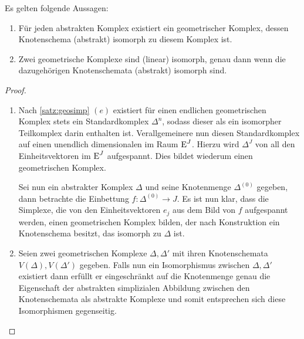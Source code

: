 \begin{Satz}
  Es gelten folgende Aussagen:
  \begin{enumerate}[(1)]
  \item Für jeden abstrakten Komplex existiert ein geometrischer
    Komplex, dessen Knotenschema (abstrakt) isomorph zu diesem Komplex
    ist.
  \item Zwei geometrische Komplexe sind (linear) isomorph, genau dann
    wenn die dazugehörigen Knotenschemata (abstrakt) isomorph sind.
  \end{enumerate}
  \begin{proof}
    \begin{enumerate}[(1)]
    \item Nach \cref{satz:geosimp} $(e)$ existiert für einen
      endlichen geometrischen Komplex stets ein Standardkomplex
      $\Delta^n$, sodass dieser als ein isomorpher Teilkomplex darin
      enthalten ist. Verallgemeinere nun diesen Standardkomplex auf
      einen unendlich dimensionalen im Raum $\operatorname{E}^J$. Hierzu wird
      $\Delta^J$ von all den Einheitsvektoren im $\operatorname{E}^J$
      aufgespannt. Dies bildet wiederum einen geometrischen Komplex.

      Sei nun ein abstrakter Komplex $\Delta$ und seine Knotenmenge
      $\Delta^{(0)}$ gegeben, dann betrachte die Einbettung
      $f : \Delta^{(0)} \rightarrow J$.  Es ist nun klar, dass die
      Simplexe, die von den Einheitsvektoren $e_j$ aus dem Bild von
      $f$ aufgespannt werden, einen geometrischen Komplex bilden, der
      nach Konstruktion ein Knotenschema besitzt, das isomorph zu
      $\Delta$ ist.

    \item Seien zwei geometrischen Komplexe $\Delta,\Delta'$ mit ihren
      Knotenschemata $V(\Delta),V(\Delta')$ gegeben. Falls nun ein
      Isomorphismus zwischen $\Delta,\Delta'$ existiert dann erfüllt
      er eingeschränkt auf die Knotenmenge genau die Eigenschaft der
      abstrakten simplizialen Abbildung zwischen den Knotenschemata
      als abstrakte Komplexe und somit entsprechen sich diese
      Isomorphismen gegenseitig.
    \end{enumerate}
  \end{proof}
\end{Satz}




